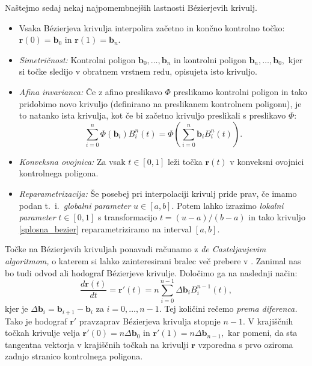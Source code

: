 \documentclass[12pt,a4paper,twoside]{article}
\theoremstyle{definition} %
\theoremstyle{plain} %
\theoremstyle{primerstyle}
\numberwithin{equation}{section}  %
\newcommand{\bV}{\mathbf{b}}
\newcommand{\rV}{\mathbf{r}}
\begin{document}
Naštejmo sedaj nekaj najpomembnejših lastnosti Bézierjevih krivulj.
\begin{itemize}
	\item Vsaka Bézierjeva krivulja interpolira začetno in končno kontrolno točko: $\rV(0)=\bV_0$ in $\rV(1)=\bV_n.$
	\item \emph{Simetričnost:} Kontrolni poligon $\bV_0,\dots,\bV_n$ in kontrolni poligon $\bV_n,\dots,\bV_0,$ kjer si točke sledijo v obratnem vrstnem redu, opisujeta isto krivuljo.
	\item \emph{Afina invarianca:} Če z afino preslikavo $\Phi$ preslikamo kontrolni poligon in tako pridobimo novo krivuljo (definirano na preslikanem kontrolnem poligonu), je to natanko ista krivulja, kot če bi začetno krivuljo preslikali s preslikavo $\Phi$:
	$$\sum_{i=0}^n\Phi(\bV_i)B_i^n(t)=\Phi\left(\sum_{i=0}^n\bV_iB_i^n(t)\right)\!.$$
	\item \emph{Konveksna ovojnica:} Za vsak $t\in[0,1]$ leži točka $\rV(t)$ v konveksni ovojnici kontrolnega poligona.
	\item \emph{Reparametrizacija:} Še posebej pri interpolaciji krivulj pride prav, če imamo podan t.\ i.\ \emph{globalni parameter} $u\in[a,b].$ Potem lahko izrazimo \emph{lokalni parameter} $t\in[0,1]$ s transformacijo $t=(u-a)/(b-a)$ in tako krivuljo \eqref{splosna_bezier} reparametriziramo na interval $[a,b]$.
\end{itemize}
Točke na Bézierjevih krivuljah ponavadi računamo z \emph{de Casteljaujevim algoritmom,} o katerem si lahko zainteresirani bralec več prebere v \cite[str.\ 80]{farin2002handbook}. Zanimal nas bo tudi odvod ali hodograf Bézierjeve krivulje. Določimo ga na naslednji način:
\begin{equation}
	\label{odvod_bezier}
	\frac{d\rV(t)}{dt}=\rV'(t)=n\sum_{i=0}^{n-1}\Delta\bV_iB_i^{n-1}(t),
\end{equation}
kjer je $\Delta\bV_i=\bV_{i+1}-\bV_i$ za $i=0,\dots,n-1.$ Tej količini rečemo \emph{prema diferenca.} Tako je hodograf $\rV'$ pravzaprav Bézierjeva krivulja stopnje $n-1.$ V krajiščnih točkah krivulje velja $\rV'(0)=n\Delta\bV_0$ in $\rV'(1)=n\Delta\bV_{n-1},$ kar pomeni, da sta tangentna vektorja v krajiščnih točkah na krivulji $\rV$ vzporedna s prvo oziroma zadnjo stranico kontrolnega poligona.
\end{document}
